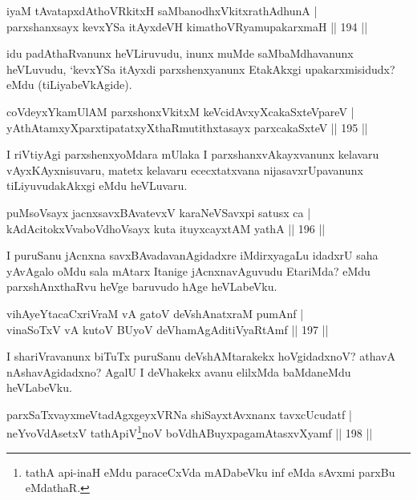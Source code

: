 \begin{shl}
iyaM tAvatapxdAthoVRkitxH saMbanodhxVkitxrathAdhunA |\\
parxshanxsayx kevxYSa itAyxdeVH kimathoVR\s yamupakarxmaH \hfill || 194 ||
\end{shl}

\begin{artha}
idu padAthaRvanunx heVLiruvudu, inunx muMde saMbaMdhavanunx heVLuvudu, `kevxYSa itAyxdi parxshenxyanunx EtakAkxgi upakarxmisidudx? eMdu (tiLiyabeVkAgide).
\end{artha}

\begin{shl}
coVdeyxYkamUlAM parxshonxVkitxM keVcidAvxyXcakaSxteV\s pareV |\\
yAthAtamxyXparxtipatatxyXthaRmutithxtasayx parxcakaSxteV \hfill || 195 ||
\end{shl}

\begin{artha}
I riVtiyAgi parxshenxyoMdara mUlaka I parxshanxvAkayxvanunx kelavaru vAyxKAyxnisuvaru, matetx kelavaru ececxtatxvana nijasavxrUpavanunx tiLiyuvudakAkxgi eMdu heVLuvaru.
\end{artha}

\begin{shl}
puMsoV\s sayx jacnxsavxBAvatevxV karaNeVSavxpi satusx ca |\\
kAdAcitokxV\s vaboVdhoV\s sayx kuta ituyxcayxtAM yathA \hfill || 196 ||
\end{shl}

\begin{artha}
I puruSanu jAcnxna savxBAvadavanAgidadxre iMdirxyagaLu idadxrU saha yAvAgalo oMdu sala mAtarx Itanige jAcnxnavAguvudu EtariMda? eMdu parxshAnxthaRvu heVge baruvudo hAge heVLabeVku.
\end{artha}

\begin{shl}
vihAyeYtacaCxriVraM vA gatoV deVshAnatxraM pumAnf |\\
vinaSoTxV vA kutoV BUyoV deVhamAgAditiVyaRtAmf \hfill || 197 ||
\end{shl}

\begin{artha}
I shariVravanunx biTuTx puruSanu deVshAMtarakekx hoVgidadxnoV? athavA nAshavAgidadxno? AgalU I deVhakekx avanu elilxMda baMdaneMdu heVLabeVku.
\end{artha}

\begin{shl}
parxSaTxvayxmeVtadAgxgeyxVRNa shiSayxtAvxnanx tavxcUcudatf |\\
neYvoVdAsetxV tathA\s piV\footnote{tathA api-inaH eMdu paraceCxVda mADabeVku inf eMda sAvxmi parxBu eMdathaR.}noV boVdhABuyxpagamAtasxvXyamf \hfill || 198 ||
\end{shl}

